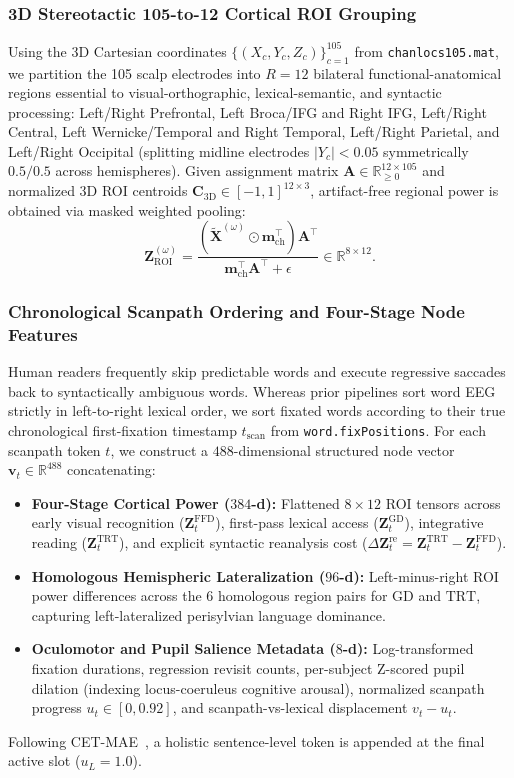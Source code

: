 \documentclass[journal]{IEEEtran}
\begin{document}
\subsubsection{3D Stereotactic 105-to-12 Cortical ROI Grouping}
Using the 3D Cartesian coordinates $\{(X_c, Y_c, Z_c)\}_{c=1}^{105}$ from \texttt{chanlocs105.mat}, we partition the 105 scalp electrodes into $R=12$ bilateral functional-anatomical regions essential to visual-orthographic, lexical-semantic, and syntactic processing: Left/Right Prefrontal, Left Broca/IFG and Right IFG, Left/Right Central, Left Wernicke/Temporal and Right Temporal, Left/Right Parietal, and Left/Right Occipital (splitting midline electrodes $|Y_c| < 0.05$ symmetrically $0.5/0.5$ across hemispheres). Given assignment matrix $\mathbf{A} \in \mathbb{R}_{\ge 0}^{12 \times 105}$ and normalized 3D ROI centroids $\mathbf{C}_{\text{3D}} \in [-1,1]^{12 \times 3}$, artifact-free regional power is obtained via masked weighted pooling:
\begin{equation}
    \mathbf{Z}_{\text{ROI}}^{(\omega)} = \frac{(\tilde{\mathbf{X}}^{(\omega)} \odot \mathbf{m}_{\text{ch}}^\top)\mathbf{A}^\top}{\mathbf{m}_{\text{ch}}^\top \mathbf{A}^\top + \epsilon} \in \mathbb{R}^{8 \times 12}.
\end{equation}

\subsubsection{Chronological Scanpath Ordering and Four-Stage Node Features}
Human readers frequently skip predictable words and execute regressive saccades back to syntactically ambiguous words. Whereas prior pipelines sort word EEG strictly in left-to-right lexical order, we sort fixated words according to their true chronological first-fixation timestamp $t_{\text{scan}}$ from \texttt{word.fixPositions}. For each scanpath token $t$, we construct a $488$-dimensional structured node vector $\mathbf{v}_t \in \mathbb{R}^{488}$ concatenating:
\begin{itemize}
    \item \textbf{Four-Stage Cortical Power ($384$-d):} Flattened $8 \times 12$ ROI tensors across early visual recognition ($\mathbf{Z}^{\text{FFD}}_t$), first-pass lexical access ($\mathbf{Z}^{\text{GD}}_t$), integrative reading ($\mathbf{Z}^{\text{TRT}}_t$), and explicit syntactic reanalysis cost ($\Delta\mathbf{Z}^{\text{re}}_t = \mathbf{Z}^{\text{TRT}}_t - \mathbf{Z}^{\text{FFD}}_t$).
    \item \textbf{Homologous Hemispheric Lateralization ($96$-d):} Left-minus-right ROI power differences across the 6 homologous region pairs for $\text{GD}$ and $\text{TRT}$, capturing left-lateralized perisylvian language dominance.
    \item \textbf{Oculomotor and Pupil Salience Metadata ($8$-d):} Log-transformed fixation durations, regression revisit counts, per-subject Z-scored pupil dilation (indexing locus-coeruleus cognitive arousal), normalized scanpath progress $u_t \in [0, 0.92]$, and scanpath-vs-lexical displacement $v_t - u_t$.
\end{itemize}
Following CET-MAE~\cite{wang2024cetmae}, a holistic sentence-level token is appended at the final active slot ($u_{L} = 1.0$).
\end{document}
